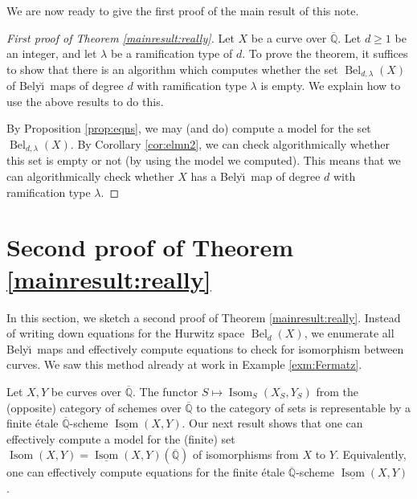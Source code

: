 \documentclass{amsproc}
\numberwithin{equation}{section}
\numberwithin{figure}{section}
\theoremstyle{definition}
\theoremstyle{remark}
\DeclareMathOperator{\Isom}{Isom}
\newcommand{\Qbar}{\overline{\mathbb{Q}}}
\DeclareMathOperator{\Bel}{Bel}
\renewcommand{\geq}{\geqslant}
\newcommand{\Belyi}{Bely\u{\i}}
\begin{document}
We are now ready to give the first proof of the main result of this note. 

\begin{proof}[First proof of Theorem \ref{mainresult:really}] Let $X$ be a curve over $\Qbar$. Let $d\geq 1$ be an integer, and let $\lambda$ be a ramification type of $d$. To prove the theorem,  it suffices to show that there is an algorithm which computes whether the set $\Bel_{d,\lambda}(X)$ of \Belyi\ maps of degree $d$ with ramification type $\lambda$ is empty. We explain how to use the above results to do this.

By Proposition \ref{prop:eqns}, we may (and do) compute a model for the set $\Bel_{d,\lambda}(X)$. By    Corollary \ref{cor:elmn2}, we can check algorithmically whether this set is empty or not (by using the   model we computed). This means that we can algorithmically check whether $X$ has a \Belyi\ map of degree $d$ with ramification type $\lambda$.
\end{proof}


 
 

\section{Second proof of Theorem \ref{mainresult:really}} \label{sec:secondproof}
In this section, we sketch a second proof of Theorem \ref{mainresult:really}. Instead of writing down equations for the Hurwitz space $\Bel_d(X)$, we enumerate all \Belyi\ maps and effectively compute equations to check for isomorphism between curves.  We saw this method already at work in Example \ref{exm:Fermatz}. 




Let $X,Y$ be curves over $\Qbar$.  The functor $S \mapsto \Isom_S(X_S,Y_S)$ from the (opposite) category of schemes over $\Qbar$ to the category of sets is representable \cite[Theorem~1.11]{DeligneMumford} by a finite \'etale $\Qbar$-scheme $\underline{\Isom}(X,Y)$. Our next result shows that one can effectively compute a model for the (finite) set $\Isom(X,Y) = \underline{\Isom}(X,Y)(\Qbar)$ of isomorphisms from $X$ to $Y$. Equivalently, one can effectively compute equations for the finite \'etale $\Qbar$-scheme $\underline{\Isom}(X,Y)$.
 
\end{document}

